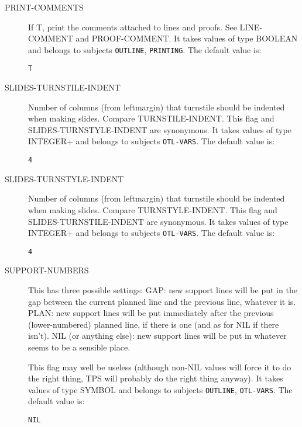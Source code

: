 \begin{description} 
\item[PRINT-COMMENTS]  
If T, print the comments attached to lines
and proofs. See LINE-COMMENT and PROOF-COMMENT.
It takes values of type BOOLEAN and belongs to subjects \texttt{OUTLINE}, \texttt{PRINTING}.  The default value is: \begin{lstlisting}
T
\end{lstlisting}

\item[SLIDES-TURNSTILE-INDENT]  
Number of columns (from leftmargin) that turnstile should be
indented when making slides. Compare TURNSTILE-INDENT.
This flag and SLIDES-TURNSTYLE-INDENT are synonymous.
It takes values of type INTEGER+ and belongs to subjects \texttt{OTL-VARS}.  The default value is: \begin{lstlisting}
4
\end{lstlisting}

\item[SLIDES-TURNSTYLE-INDENT]  
Number of columns (from leftmargin) that turnstile should be
indented when making slides. Compare TURNSTYLE-INDENT.
This flag and SLIDES-TURNSTILE-INDENT are synonymous.
It takes values of type INTEGER+ and belongs to subjects \texttt{OTL-VARS}.  The default value is: \begin{lstlisting}
4
\end{lstlisting}

\item[SUPPORT-NUMBERS]  
This has three possible settings:
GAP: new support lines will be put in the gap between the 
current planned line and the previous line, whatever it is.
PLAN: new support lines will be put immediately after the
previous (lower-numbered) planned line, if there is one 
(and as for NIL if there isn't).
NIL (or anything else): new support lines will be put in 
whatever seems to be a sensible place.

This flag may well be useless (although non-NIL values
will force it to do the right thing, TPS will probably
do the right thing anyway).
It takes values of type SYMBOL and belongs to subjects \texttt{OUTLINE}, \texttt{OTL-VARS}.  The default value is: \begin{lstlisting}
NIL
\end{lstlisting}


\end{description}
